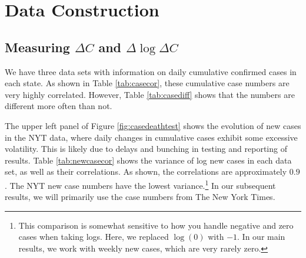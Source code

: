 \documentclass[3p, longtitle]{elsarticle}
\theoremstyle{definition}
\begin{document}
\newpage

\appendix

\section{Data Construction}


\subsection{Measuring $\Delta C$ and $\Delta\log \Delta C$}

We have three data sets with information on daily cumulative confirmed
cases in each state. As shown in Table \ref{tab:casecor}, these
cumulative case numbers are very highly correlated. However, Table
\ref{tab:casediff} shows that the numbers are different more often
than not.






The upper left panel of Figure \ref{fig:casedeathtest} shows the evolution of new cases in the NYT data, where daily changes in cumulative
cases  exhibit some excessive volatility. This is likely due to delays
and bunching in testing and reporting of results.
Table
\ref{tab:newcasecor} shows the variance of log new cases in each data
set, as well as their correlations. As shown, the correlations are
approximately $0.9$. The NYT new case
numbers have the lowest variance.\footnote{This comparison is somewhat
  sensitive to how you handle negative and zero cases when taking
  logs. Here, we replaced $\log(0)$ with $-1$. In our main
  results, we work with weekly new cases, which are very rarely zero.}
In our subsequent results, we will primarily use the case numbers from
The New York Times.
\end{document}
